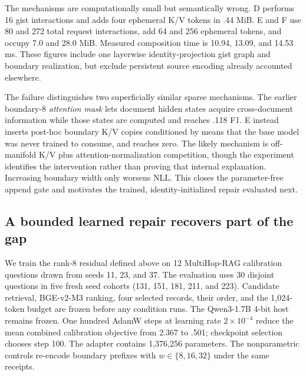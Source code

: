 \documentclass[11pt]{article}
\begin{document}
The mechanisms are computationally small but semantically wrong. D performs
16 gist interactions and adds four ephemeral K/V tokens in .44 MiB. E and F
use 80 and 272 total request interactions, add 64 and 256 ephemeral tokens,
and occupy 7.0 and 28.0 MiB. Measured composition time is 10.94, 13.09, and
14.53 ms. These figures include one layerwise identity-projection gist graph
and boundary realization, but exclude persistent source encoding already
accounted elsewhere.

\begin{table}[ht]
\centering
\caption{Request-local composition cost on the Apple M4 Pro. FLOPs are an
operation-count estimate; latency and bytes are measured.}
\label{tab:gist-composition-systems}
\small
\resizebox{\linewidth}{!}{}
\end{table}

The failure distinguishes two superficially similar sparse mechanisms. The
earlier boundary-8 \emph{attention mask} lets document hidden states acquire
cross-document information while those states are computed and reaches .118
F1. E instead inserts post-hoc boundary K/V copies conditioned by means that
the base model was never trained to consume, and reaches zero. The likely
mechanism is off-manifold K/V plus attention-normalization competition, though
the experiment identifies the intervention rather than proving that internal
explanation. Increasing boundary width only worsens NLL. This closes the
parameter-free append gate and motivates the trained, identity-initialized
repair evaluated next.

\subsection{A bounded learned repair recovers part of the gap}
We train the rank-8 residual defined above on 12 MultiHop-RAG calibration
questions drawn from seeds 11, 23, and 37. The evaluation uses 30 disjoint
questions in five fresh seed cohorts (131, 151, 181, 211, and 223). Candidate
retrieval, BGE-v2-M3 ranking, four selected records, their order, and the
1,024-token budget are frozen before any condition runs. The Qwen3-1.7B 4-bit
host remains frozen. One hundred AdamW steps at learning rate
$2\times10^{-4}$ reduce the mean combined calibration objective from 2.367 to
.501; checkpoint selection chooses step 100. The adapter contains 1,376,256
parameters. The nonparametric controls re-encode boundary prefixes with
$w\in\{8,16,32\}$ under the same receipts.
\end{document}
